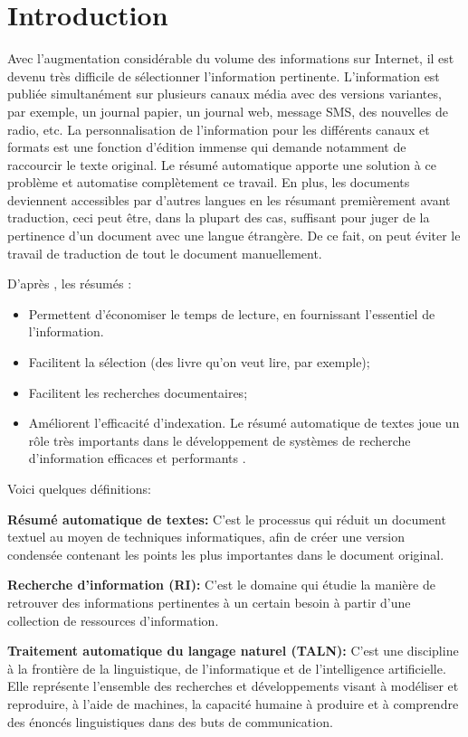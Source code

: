 \documentclass[12pt, oneside, a4paper]{book}
\begin{document}
\section{Introduction}

Avec l’augmentation considérable du volume des informations sur Internet, il est devenu très difficile de sélectionner l’information pertinente. 
L’information est publiée simultanément sur plusieurs canaux média avec des versions variantes, par exemple, un journal papier, un journal web, message SMS, des nouvelles de radio, etc. 
La personnalisation de l'information pour les différents canaux et formats est une fonction d'édition immense qui demande
notamment de raccourcir le texte original.
Le résumé automatique apporte une solution à ce problème et automatise complètement ce travail. 
En plus, les documents deviennent accessibles par d'autres langues en les résumant premièrement avant traduction, ceci peut être, dans la plupart des cas, suffisant pour juger de la pertinence d'un document avec une langue étrangère. 
De ce fait, on peut éviter le travail de traduction de tout le document manuellement.

D’après \cite{75-borko-bernier}, les résumés :
\begin{itemize}
\item Permettent d'économiser le temps de lecture, en fournissant l’essentiel de
l’information.
\item Facilitent la sélection (des livre qu’on veut lire, par exemple);
\item Facilitent les recherches documentaires;
\item Améliorent l'efficacité d'indexation. 
Le résumé automatique de textes joue un rôle très importants dans le développement de systèmes de recherche d'information efficaces et
performants \cite{03-allan-al}.
\end{itemize}

Voici quelques définitions:

\noindent
\textbf{Résumé automatique de textes:} C’est le processus qui réduit un document textuel au moyen de techniques informatiques, afin de créer une version condensée contenant les points les plus importantes dans le document original.

\noindent
\textbf{Recherche d’information (RI):} C’est le domaine qui étudie la manière de retrouver des informations pertinentes à un certain besoin à partir d’une collection de ressources d'information.

\noindent
\textbf{Traitement automatique du langage naturel (TALN):} C’est une discipline à la frontière de la linguistique, de l'informatique et de l'intelligence artificielle. 
Elle représente l’ensemble des recherches et développements visant à modéliser et reproduire, à l’aide de machines, la capacité humaine à produire et à comprendre des énoncés linguistiques dans des buts de communication.
\end{document}

